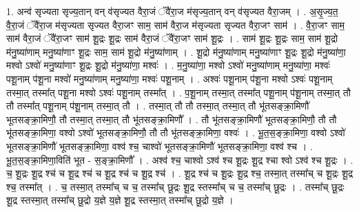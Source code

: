 \documentclass[17pt]{extarticle}
\begin{document}
1. अन्व॑ सृज्यता सृज्य॒तान् वन् व॑सृज्यत वैरा॒जं ॅवै॑रा॒ज म॑सृज्य॒तान् वन् व॑सृज्यत वैरा॒जम् । . अ॒सृ॒ज्य॒त॒ वै॒रा॒जं ॅवै॑रा॒ज म॑सृज्यता सृज्यत वैरा॒जꣳ साम॒ साम॑ वैरा॒ज म॑सृज्यता सृज्यत वैरा॒जꣳ साम॑ । . वै॒रा॒जꣳ साम॒ साम॑ वैरा॒जं ॅवै॑रा॒जꣳ साम॑ शू॒द्रः शू॒द्रः साम॑ वैरा॒जं ॅवै॑रा॒जꣳ साम॑ शू॒द्रः । . साम॑ शू॒द्रः शू॒द्रः साम॒ साम॑ शू॒द्रो म॑नु॒ष्या॑णाम् मनु॒ष्या॑णाꣳ शू॒द्रः साम॒ साम॑ शू॒द्रो म॑नु॒ष्या॑णाम् । . शू॒द्रो म॑नु॒ष्या॑णाम् मनु॒ष्या॑णाꣳ शू॒द्रः शू॒द्रो म॑नु॒ष्या॑णा॒ मश्वो ऽश्वो॑ मनु॒ष्या॑णाꣳ शू॒द्रः शू॒द्रो म॑नु॒ष्या॑णा॒ मश्वः॑ । . म॒नु॒ष्या॑णा॒ मश्वो ऽश्वो॑ मनु॒ष्या॑णाम् मनु॒ष्या॑णा॒ मश्वः॑ पशू॒नाम् प॑शू॒ना मश्वो॑ मनु॒ष्या॑णाम् मनु॒ष्या॑णा॒ मश्वः॑ पशू॒नाम् । . अश्वः॑ पशू॒नाम् प॑शू॒ना मश्वो ऽश्वः॑ पशू॒नाम् तस्मा॒त् तस्मा᳚त् पशू॒ना मश्वो ऽश्वः॑ पशू॒नाम् तस्मा᳚त् । . प॒शू॒नाम् तस्मा॒त् तस्मा᳚त् पशू॒नाम् प॑शू॒नाम् तस्मा॒त् तौ तौ तस्मा᳚त् पशू॒नाम् प॑शू॒नाम् तस्मा॒त् तौ । . तस्मा॒त् तौ तौ तस्मा॒त् तस्मा॒त् तौ भू॑तसङ्क्रा॒मिणौ॑ भूतसङ्क्रा॒मिणौ॒ तौ तस्मा॒त् तस्मा॒त् तौ भू॑तसङ्क्रा॒मिणौ᳚ । . तौ भू॑तसङ्क्रा॒मिणौ॑ भूतसङ्क्रा॒मिणौ॒ तौ तौ भू॑तसङ्क्रा॒मिणा॒ वश्वो ऽश्वो॑ भूतसङ्क्रा॒मिणौ॒ तौ तौ भू॑तसङ्क्रा॒मिणा॒ वश्वः॑ । . भू॒त॒स॒ङ्क्रा॒मिणा॒ वश्वो ऽश्वो॑ भूतसङ्क्रा॒मिणौ॑ भूतसङ्क्रा॒मिणा॒ वश्व॑ श्च॒ चाश्वो॑ भूतसङ्क्रा॒मिणौ॑ भूतसङ्क्रा॒मिणा॒ वश्व॑ श्च । . भू॒त॒स॒ङ्क्रा॒मिणा॒विति॑ भूत - स॒ङ्क्रा॒मिणौ᳚ । . अश्व॑ श्च॒ चाश्वो ऽश्व॑ श्च शू॒द्रः शू॒द्र श्चा श्वो ऽश्व॑ श्च शू॒द्रः । . च॒ शू॒द्रः शू॒द्र श्च॑ च शू॒द्र श्च॑ च शू॒द्र श्च॑ च शू॒द्र श्च॑ । . शू॒द्र श्च॑ च शू॒द्रः शू॒द्र श्च॒ तस्मा॒त् तस्मा᳚च् च शू॒द्रः शू॒द्र श्च॒ तस्मा᳚त् । . च॒ तस्मा॒त् तस्मा᳚च् च च॒ तस्मा᳚च् छू॒द्रः शू॒द्र स्तस्मा᳚च् च च॒ तस्मा᳚च् छू॒द्रः । . तस्मा᳚च् छू॒द्रः शू॒द्र स्तस्मा॒त् तस्मा᳚च् छू॒द्रो य॒ज्ञे य॒ज्ञे शू॒द्र स्तस्मा॒त् तस्मा᳚च् छू॒द्रो य॒ज्ञे । \newline
\end{document}
